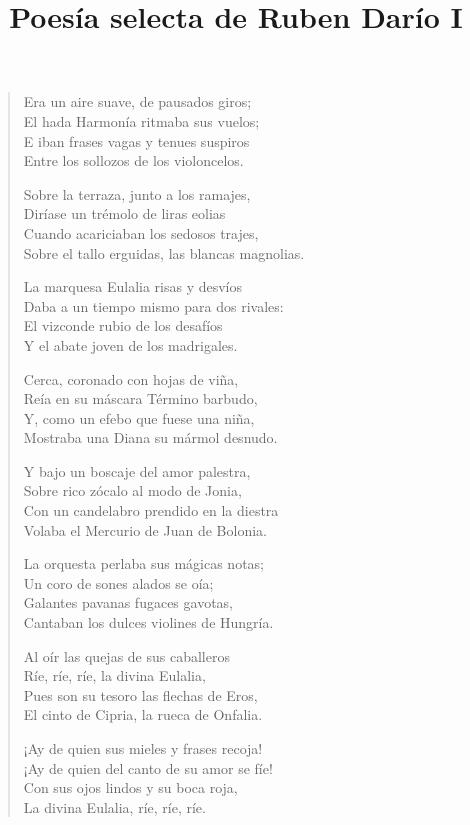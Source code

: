 \documentclass[12pt]{article}
\date{}
\title{Poesía selecta de Ruben Darío I}
\begin{document}
\maketitle
\tableofcontents
\clearpage
{}
\begin{verse}

Era un aire suave, de pausados giros;\\
El hada Harmonía ritmaba sus vuelos;\\
E iban frases vagas y tenues suspiros\\
Entre los sollozos de los violoncelos.  

Sobre la terraza, junto a los ramajes,\\
Diríase un trémolo de liras eolias\\
Cuando acariciaban los sedosos trajes,\\
Sobre el tallo erguidas, las blancas magnolias.  

La marquesa Eulalia risas y desvíos\\
Daba a un tiempo mismo para dos rivales:\\
El vizconde rubio de los desafíos\\
Y el abate joven de los madrigales.  

Cerca, coronado con hojas de viña,\\
Reía en su máscara Término barbudo,\\
Y, como un efebo que fuese una niña,\\
Mostraba una Diana su mármol desnudo.  

Y bajo un boscaje del amor palestra,\\
Sobre rico zócalo al modo de Jonia,\\
Con un candelabro prendido en la diestra\\
Volaba el Mercurio de Juan de Bolonia.  

La orquesta perlaba sus mágicas notas;\\
Un coro de sones alados se oía;\\
Galantes pavanas fugaces gavotas,\\
Cantaban los dulces violines de Hungría.  

Al oír las quejas de sus caballeros\\
Ríe, ríe, ríe, la divina Eulalia,\\
Pues son su tesoro las flechas de Eros,\\
El cinto de Cipria, la rueca de Onfalia.  

¡Ay de quien sus mieles y frases recoja!\\
¡Ay de quien del canto de su amor se fíe!\\
Con sus ojos lindos y su boca roja,\\
La divina Eulalia, ríe, ríe, ríe.  


\end{verse}
\end{document}
